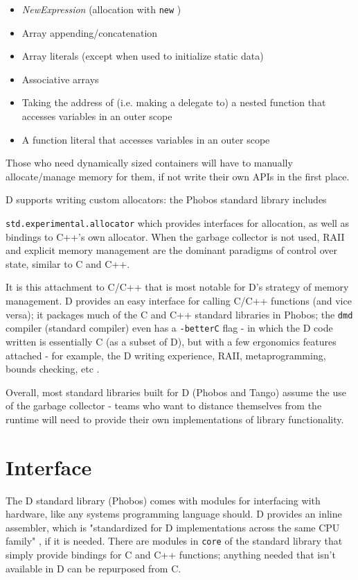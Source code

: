 \documentclass[letterpaper,twocolumn,10pt]{article}
\newcommand{\code}[1]{
    \texttt{#1}
}
\begin{document}
\begin{itemize}
    \item \emph{NewExpression} (allocation with \code{new})
    \item Array appending/concatenation
    \item Array literals (except when used to initialize static data)
    \item Associative arrays
    \item Taking the address of (i.e. making a delegate to) a nested function that accesses variables in an outer scope
    \item A function literal that accesses variables in an outer scope
\end{itemize}

Those who need dynamically sized containers will have to manually allocate/manage
memory for them, if not write their own APIs in the first place.

D supports writing custom allocators: the Phobos standard library includes
\code{std.experimental.allocator} which provides interfaces for allocation,
as well as bindings to C++'s own allocator.  When the garbage collector is not
used, RAII and explicit memory management are the dominant paradigms of control
over state, similar to C and C++.

It is this attachment to C/C++ that is most notable for D's strategy of memory
management.  D provides an easy interface for calling C/C++ functions (and vice
versa); it packages much of the C and C++ standard libraries in Phobos;
the \code{dmd} compiler (standard compiler) even has a \code{-betterC} flag - in
which the D code written is essentially C (as a subset of D), but 
with a few ergonomics features attached - for example, the D writing experience,
RAII, metaprogramming, bounds checking, etc \cite{betterc}.

Overall, most standard libraries built for D (Phobos and Tango)
assume the use of the garbage collector - teams who want to distance themselves
from the runtime will need to provide their own implementations of library
functionality.


\section*{Interface}

The D standard library (Phobos) comes with modules for interfacing with hardware,
like any systems programming language should.  D provides an inline assembler,
which is "standardized for D implementations across the same CPU family" 
\cite{iasm}, if it is needed.  There are modules in \code{core} of the standard
library that simply provide bindings for C and C++ functions; anything needed
that isn't available in D can be repurposed from C.
\end{document}
